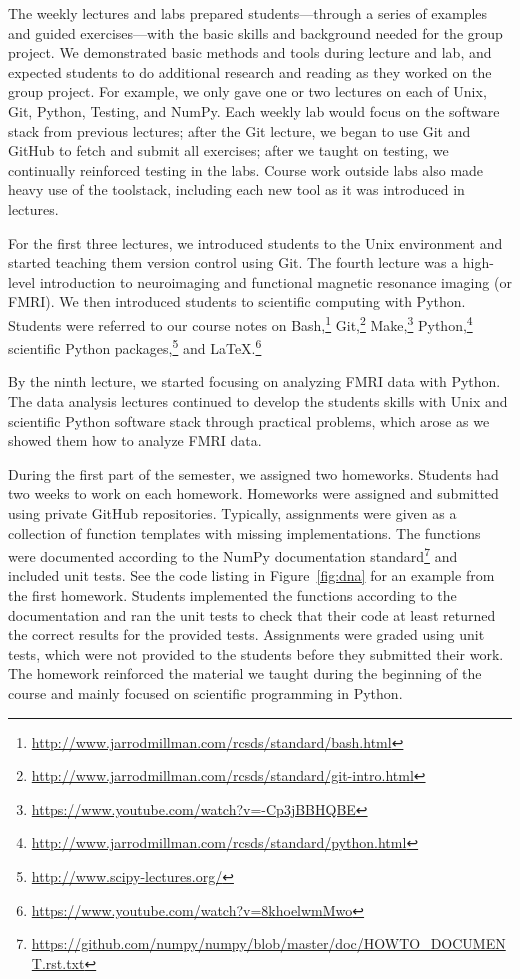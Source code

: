 The weekly lectures and labs prepared students---through a
series of examples and guided exercises---with the basic skills and
background needed for the group project.
We demonstrated basic methods and tools during lecture and lab,
and expected students to do additional research and reading as they worked on
the group project.
For example, we only gave one or two lectures on each of Unix, Git, Python,
Testing, and NumPy.
Each weekly lab would focus on the software stack from previous lectures;
after the Git lecture, we began to use Git and GitHub to fetch and submit all
exercises;
after we taught on testing, we continually reinforced testing in the labs.
Course work outside labs also made heavy use of the toolstack, including each
new tool as it was introduced in lectures.

For the first three lectures, we introduced students to the Unix environment
and started teaching them version control using Git.
The fourth lecture was a high-level introduction to neuroimaging and
functional magnetic resonance imaging (or FMRI).
We then introduced students to scientific computing with Python.
Students were referred to our course notes on
Bash,\footnote{\url{http://www.jarrodmillman.com/rcsds/standard/bash.html}}
Git,\footnote{\url{http://www.jarrodmillman.com/rcsds/standard/git-intro.html}}
Make,\footnote{\url{https://www.youtube.com/watch?v=-Cp3jBBHQBE}}
Python,\footnote{\url{http://www.jarrodmillman.com/rcsds/standard/python.html}}
scientific Python packages,\footnote{\url{http://www.scipy-lectures.org/}}
and \LaTeX.\footnote{\url{https://www.youtube.com/watch?v=8khoelwmMwo}}

By the ninth lecture, we started focusing on analyzing FMRI data with Python.
The data analysis lectures continued to develop the students skills with
Unix and scientific Python software stack through practical problems,
which arose as we showed them how to analyze FMRI data.

During the first part of the semester, we assigned two homeworks.
Students had two weeks to work on each homework.
Homeworks were assigned and submitted using private GitHub repositories.
Typically, assignments were given as a collection of function templates with
missing implementations.
The functions were documented according to the NumPy documentation
standard\footnote{\url{https://github.com/numpy/numpy/blob/master/doc/HOWTO_DOCUMENT.rst.txt}}
and included unit tests.
See the code listing in Figure~\ref{fig:dna} for an example from the first homework.
Students implemented the functions according to the documentation
and ran the unit tests to check that their code at least
returned the correct results for the provided tests.
Assignments were graded using unit tests, which were not provided to
the students before they submitted their work.
The homework reinforced the material we taught during the
beginning of the course and mainly focused on scientific programming
in Python.

